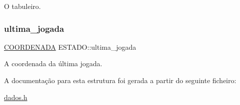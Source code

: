 O tabuleiro. 

\mbox{\label{structESTADO_a4896a5c5c1f40b43fb795623327e3f47}} 
\subsubsection{\texorpdfstring{ultima\+\_\+jogada}{ultima\_jogada}}
{\footnotesize\ttfamily \hyperlink{structCOORDENADA}{C\+O\+O\+R\+D\+E\+N\+A\+DA} E\+S\+T\+A\+D\+O\+::ultima\+\_\+jogada}



A coordenada da última jogada. 



A documentação para esta estrutura foi gerada a partir do seguinte ficheiro\+:\begin{DoxyCompactItemize}
\item 
\hyperlink{dados_8h}{dados.\+h}\end{DoxyCompactItemize}
